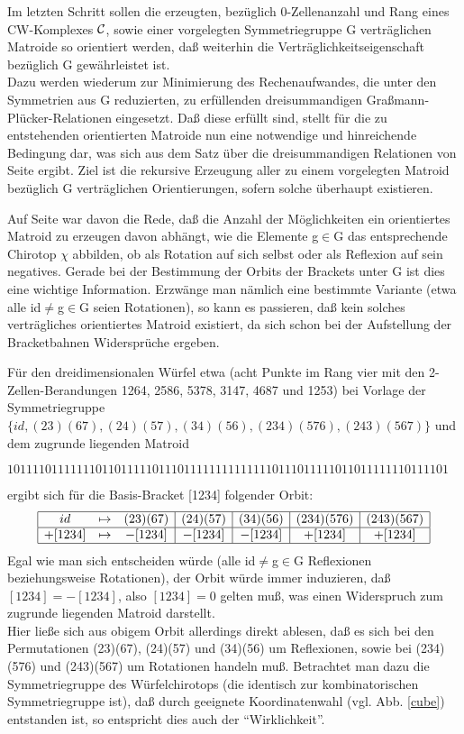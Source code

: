 Im letzten Schritt sollen die erzeugten, bezüglich 0-Zellenanzahl
und Rang eines CW-Komplexes ${\cal C}$, sowie einer vorgelegten Symmetriegruppe G
verträglichen Matroide so orientiert werden, daß weiterhin die
Verträglichkeitseigenschaft bezüglich G gewährleistet ist.\\
Dazu werden wiederum zur Minimierung des Rechenaufwandes, die unter den
Symmetrien aus G reduzierten, zu erfüllenden dreisummandigen
Graßmann-Plücker-Relationen eingesetzt. Daß diese erfüllt sind, stellt für
die zu entstehenden orientierten Matroide nun eine notwendige und hinreichende
Bedingung dar, was sich aus dem Satz über die dreisummandigen Relationen von
Seite \pageref{dgpr} ergibt. Ziel ist die rekursive Erzeugung aller zu einem
vorgelegten Matroid bezüglich G verträglichen Orientierungen, sofern solche
überhaupt existieren.

Auf Seite \pageref{symmtest} war davon die Rede, daß die Anzahl der
Möglichkeiten ein orientiertes Matroid zu erzeugen davon abhängt, wie die
Elemente g$\in$G das entsprechende Chirotop $\chi$ abbilden, ob als Rotation
auf sich selbst oder als Reflexion auf sein negatives. Gerade bei der
Bestimmung der Orbits der Brackets unter G ist dies eine wichtige Information.
Erzwänge man nämlich eine bestimmte Variante (etwa alle id$\neq$g$\in$G seien
Rotationen), so kann es passieren, daß kein solches verträgliches orientiertes
Matroid existiert, da sich schon bei der Aufstellung der Bracketbahnen
Widersprüche ergeben.

Für den dreidimensionalen Würfel etwa (acht Punkte im Rang vier mit den
2-Zellen-Berandungen 1264, 2586, 5378, 3147, 4687 und 1253) bei Vorlage der
Symmetriegruppe $\{id, (23)(67), (24)(57), (34)(56), (234)(576), (243)(567)\}$
und dem zugrunde liegenden Matroid

\begin{center}{\small
$1011110111111101101111101110111111111111110111011111011011111110111101$
}\end{center}

ergibt sich für die Basis-Bracket [1234] folgender Orbit:
$$
\begin{array}{|ccc|c|c|c|c|}
\hline
id & \mapsto & (23)(67) & (24)(57) & (34)(56) & (234)(576) & (243)(567) \\
\hline
+[1234] & \mapsto & -[1234] & -[1234] & -[1234] & +[1234] & +[1234] \\
\hline
\end{array}
$$
Egal wie man sich entscheiden würde (alle id$\neq$g$\in$G Reflexionen
beziehungsweise Rotationen), der Orbit würde immer induzieren, daß
$[1234]=-[1234]$, also $[1234]=0$ gelten muß, was einen Widerspruch zum
zugrunde liegenden Matroid darstellt.\\
Hier ließe sich aus obigem Orbit allerdings direkt ablesen, daß es sich bei
den Permutationen (23)(67), (24)(57) und (34)(56) um Reflexionen, sowie bei
(234)(576) und (243)(567) um Rotationen handeln muß. Betrachtet man dazu
die Symmetriegruppe des Würfelchirotops (die identisch zur kombinatorischen
Symmetriegruppe ist), daß durch geeignete Koordinatenwahl (vgl. Abb.
\ref{cube}) entstanden ist, so entspricht dies auch der "`Wirklichkeit"'.
\vskip4mm

